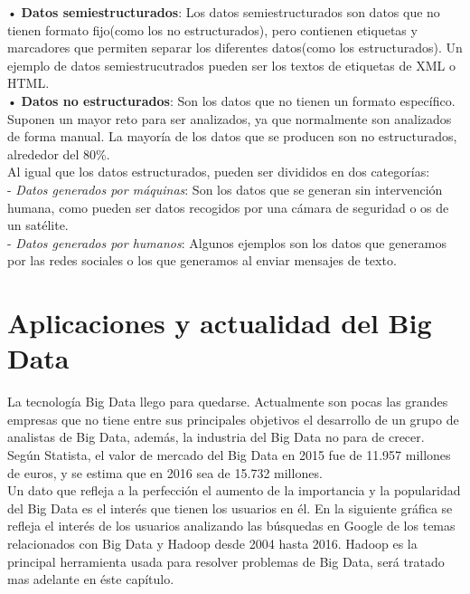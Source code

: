 •	\textbf{Datos semiestructurados}: Los datos semiestructurados son datos que no tienen formato fijo(como los no estructurados), pero contienen etiquetas y marcadores que permiten separar los diferentes datos(como los estructurados). Un ejemplo de datos semiestrucutrados pueden ser los textos de etiquetas de XML o HTML.\\



•	\textbf{Datos no estructurados}: Son los datos que no tienen un formato específico. Suponen un mayor reto para ser analizados, ya que normalmente son analizados de forma manual. La mayoría de los datos que se producen son no estructurados, alrededor del 80\%.\\

Al igual que los datos estructurados, pueden ser divididos en dos categorías:\\

-	\emph{Datos generados por máquinas}: Son los datos que se generan sin intervención humana, como pueden ser datos recogidos por una cámara de seguridad o os de un satélite.\\


-	\emph{Datos generados por humanos}: Algunos ejemplos son los datos que generamos por las redes sociales o los que generamos al enviar mensajes de texto.


\section{Aplicaciones y actualidad del Big Data}

La tecnología Big Data llego para quedarse. Actualmente  son pocas las grandes empresas que no tiene entre sus principales objetivos el desarrollo de un grupo de analistas de Big Data, además, la industria del Big Data no para de crecer.\\

Según Statista,  el valor de mercado del Big Data en 2015 fue de 11.957 millones de euros, y se estima que en 2016 sea de 15.732 millones. \cite{mercado_bigdata} \\

Un dato que refleja a la perfección el aumento de la importancia y la popularidad del Big Data es el interés que tienen los usuarios en él. En la siguiente gráfica se refleja el interés de los usuarios analizando las búsquedas en Google de los temas relacionados con Big Data y Hadoop desde 2004 hasta 2016. Hadoop es la principal herramienta usada para resolver problemas de Big Data, será tratado mas adelante en éste capítulo.\\

